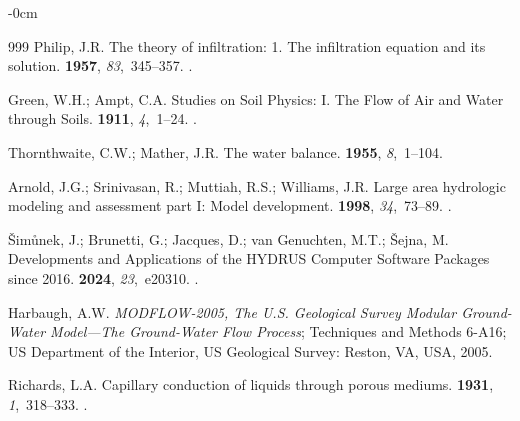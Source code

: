 \documentclass[land,review,accept,pdftex,oneauthor]{Definitions/mdpi}
\begin{document}
\begin{adjustwidth}{-\extralength}{0cm}
\begin{thebibliography}{999}
Philip, J.R.
\newblock The theory of infiltration: 1. The infiltration equation and its
  solution.
 {\bf 1957}, {\em 83},~345--357.
.

Green, W.H.; Ampt, C.A.
\newblock Studies on Soil Physics: I. The Flow of Air and Water through Soils.
 {\bf 1911}, {\em 4},~1--24.
.

Thornthwaite, C.W.; Mather, J.R.
\newblock The water balance.
 {\bf 1955}, {\em 8},~1--104.

Arnold, J.G.; Srinivasan, R.; Muttiah, R.S.; Williams, J.R.
\newblock Large area hydrologic modeling and assessment part I: Model
  development. %
 {\bf 1998},
  {\em 34},~73--89.
.

{\v{S}}im{\r{u}}nek, J.; Brunetti, G.; Jacques, D.; van Genuchten, M.T.;
  {\v{S}}ejna, M.
\newblock Developments and Applications of the {HYDRUS} Computer Software
  Packages since 2016.
 {\bf 2024}, {\em 23},~e20310.
.

Harbaugh, A.W.
\newblock \emph{{MODFLOW-2005}, The {U.S.} Geological Survey Modular Ground-Water
  Model---The Ground-Water Flow Process};
\newblock Techniques and Methods 6-A16;  US Department of the Interior, US Geological Survey: Reston, VA, USA,  2005.

Richards, L.A.
\newblock Capillary conduction of liquids through porous mediums. %
 {\bf 1931}, {\em 1},~318--333.
.


\end{thebibliography}
\end{adjustwidth}
\end{document}
